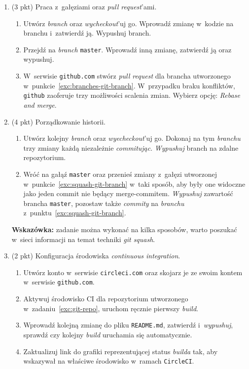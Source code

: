 \documentclass[12pt]{article}
\begin{document}
\begin{enumerate}
        \item\label{exc:branches}
            (3 pkt) Praca z~gałęziami oraz \textit{pull request}'ami.
            \begin{enumerate}
              \item \label{exc:branches-git-branch}Utwórz \textit{branch} oraz \textit{wycheckout}'uj go. Wprowadź zmianę w~kodzie na branchu i~zatwierdź ją. Wypushuj branch.
              \item Przejdź na \textit{branch} \texttt{master}. Wprowadź inną zmianę, zatwierdź ją oraz wypushuj.
              \item W~serwisie \texttt{github.com} stwórz \textit{pull request} dla brancha utworzonego w~punkcie~\ref{exc:branches-git-branch}. W~przypadku braku konfliktów, \texttt{github} zaoferuje trzy możliwości scalenia zmian. Wybierz opcję: \textit{Rebase and merge}.
            \end{enumerate}

        \item\label{exc:squash}
            (4 pkt) Porządkowanie historii.
            \begin{enumerate}
              \item \label{exc:squash-git-branch}Utwórz kolejny \textit{branch} oraz \textit{wyecheckout}'uj go. Dokonaj na tym \textit{branchu} trzy zmiany każdą niezależnie \textit{commitując}. \textit{Wypushuj} branch na zdalne repozytorium.
              \item Wróć na gałąź \texttt{master} oraz przenieś zmiany z~gałęzi utworzonej w~punkcie~\ref{exc:squash-git-branch} w~taki sposób, aby były one widoczne jako jeden commit nie będący merge-commitem. \textit{Wypushuj} zawartość brancha \texttt{master}, pozostaw także \textit{commity} na \textit{branchu} z~punktu~\ref{exc:squash-git-branch}.
            \end{enumerate}
            \textbf{Wskazówka:} zadanie można wykonać na kilka sposobów, warto poszukać w~sieci informacji na temat techniki \textit{git squash}.

        \item\label{exc:travis-ci}
            (2 pkt) Konfiguracja środowiska \textit{continuous integration}.
            \begin{enumerate}
              \item Utwórz konto w~serwisie \texttt{circleci.com} oraz skojarz je ze swoim kontem w~serwisie \texttt{github.com}.
              \item Aktywuj środowisko CI dla repozytorium utworzonego w~zadaniu~\ref{exc:git-repo}, uruchom ręcznie pierwszy \textit{build}.
              \item Wprowadź kolejną zmianę do pliku \texttt{README.md}, zatwierdź i~\textit{wypushuj}, sprawdź czy kolejny \textit{build} uruchamia się automatycznie.
              \item Zaktualizuj link do grafiki reprezentującej status \textit{builda} tak, aby wskazywał na właściwe środowisko w~ramach \texttt{CircleCI}.
            \end{enumerate}


\end{enumerate}
\end{document}
